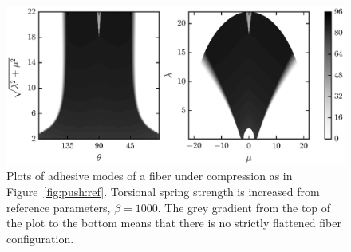	\begin{figure}[t]
		\begin{center}
			\includegraphics{./fig/ch3/push/b1000/grid.eps}
		\end{center}	
		\caption{Plots of adhesive modes of a fiber under compression as in Figure~\ref{fig:push:ref}. Torsional spring strength is increased from reference parameters, $\beta=1000$. The grey gradient from the top of the plot to the bottom means that there is no strictly flattened fiber configuration.
		\label{fig:push:b1000}}
	\end{figure}
	
